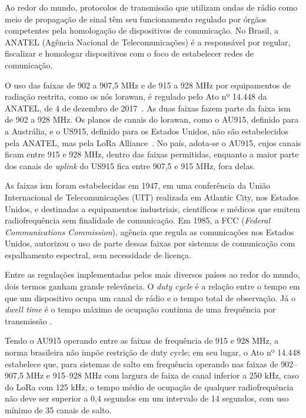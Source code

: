 \label{subsec:restricoes_regulatorias}
Ao redor do mundo, protocolos de transmissão que utilizam 
ondas de rádio como meio de propagação de sinal
têm seu funcionamento regulado por órgãos competentes 
pela homologação de dispositivos de comunicação.
No Brasil, a ANATEL (Agência Nacional de Telecomunicações) 
é a responsável por regular, fiscalizar e 
homologar dispositivos com o foco 
de estabelecer redes de comunicação. 

O uso das faixas de 902 a 907,5 MHz e de 915 a 928 MHz por
equipamentos de radiação restrita, como os nós \gls{lorawan}, é regulado pelo
Ato nº 14.448 da ANATEL, de 4 de dezembro de 2017~\cite{anatel2017}.
As duas faixas fazem parte da faixa \gls{ism} de 902 a 928 MHz.
Os planos de canais do \gls{lorawan}, como o AU915, definido para a Austrália,
e o US915, definido para os Estados Unidos, não são estabelecidos pela ANATEL,
mas pela LoRa Alliance~\cite{lora_alliance_rp002_105}. No país, adota-se o
AU915, cujos canais ficam entre 915 e 928 MHz, dentro das faixas permitidas,
enquanto a maior parte dos canais de \textit{uplink} do US915 fica entre
907,5 e 915 MHz, fora delas.

As faixas \gls{ism} foram estabelecidas em 1947, em uma conferência da
União Internacional de Telecomunicações (UIT) realizada em Atlantic City,
nos Estados Unidos, e destinadas a equipamentos industriais, científicos e
médicos que emitem radiofrequência sem finalidade de comunicação. Em 1985, a
FCC (\textit{Federal Communications Commission}), agência que regula as
comunicações nos Estados Unidos, autorizou o uso de parte dessas faixas por
sistemas de comunicação com espalhamento espectral, sem necessidade de licença.

Entre as regulações implementadas pelos mais diversos países ao redor 
do mundo, dois termos ganham grande relevância. 
O \textit{duty cycle} é a relação entre o tempo em que um 
dispositivo ocupa um canal de rádio e o tempo total de observação. 
Já o \textit{dwell time} é o tempo máximo de ocupação 
contínua de uma frequência por transmissão \cite{adam2022}.

Tendo o AU915 operando entre as faixas de frequência de 915 e 928 MHz, 
a norma brasileira não impõe restrição de duty cycle; em seu lugar, 
o Ato nº 14.448 estabelece que, para sistemas de salto em frequência 
operando nas faixas de 902–907,5 MHz e 915–928 MHz com largura de faixa 
de canal inferior a 250 kHz, caso do LoRa com 125 kHz, o tempo médio 
de ocupação de qualquer radiofrequência não deve ser superior a 0,4 segundos 
em um intervalo de 14 segundos, com uso mínimo de 35 canais de salto. 

